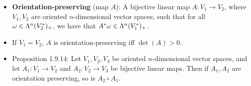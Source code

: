 \documentclass[../notes.tex]{subfiles}
\begin{document}
\begin{itemize}
\begin{proof}
\begin{equation*}
        \end{equation*}
        for all $j=1,\dots,n$. Now as will be explained below, $A$ must have the form
        \begin{equation*}
            A =
            \begin{pmatrix}
                B & C\\
                0 & D\\
            \end{pmatrix}
        \end{equation*}
        where $B$ is the $r\times r$ matrix expressing $\pi(e_1),\dots,\pi(e_r)$ as linear combinations of $\pi(f_1),\dots,\pi(f_r)$, and $D$ is the $k\times k$ matrix expressing the basis vectors $e_{r+1},\dots,e_n$ as linear combinations of $f_{r+1},\dots,f_n$. We have just explained $B$ and $D$. We don't particularly care about $C$ or have a good way of defining its structure. We can, however, take the block labeled zero to be the $k\times r$ zero matrix by Proposition 1.2.9; in particular, since these components of these vectors will be fed into $\pi$ and fall within $W$, they can moved around wherever without altering the identities of the $W$-cosets to which they pertain. Having justified this structure for $A$, we see that we can take
        \begin{equation*}
            \det(A) = \det(B)\det(D)
        \end{equation*}
        It follows by Proposition 1.9.7 as well as the positivity of $\det(A)$ and $\det(B)$ that $\det(D)$ is positive, and hence the orientation of $e_{r+1},\dots,e_n$ and $f_{r+1},\dots,f_n$ are one and the same.
    \end{proof}
    \item \textbf{Orientation-preserving} (map $A$): A bijective linear map $A:V_1\to V_2$, where $V_1,V_2$ are oriented $n$-dimensional vector spaces, such that for all $\omega\in\lam[n]{V_2^*}_+$, we have that $A^*\omega\in\lam[n]{V_1^*}_+$.
    \item If $V_1=V_2$, $A$ is orientation-preserving iff $\det(A)>0$.
    \item Proposition 1.9.14: Let $V_1,V_2,V_3$ be oriented $n$-dimensional vector spaces, and let $A_1:V_1\to V_2$ and $A_2:V_2\to V_3$ be bijective linear maps. Then if $A_1,A_2$ are orientation preserving, so is $A_2\circ A_1$.
\end{itemize}
\end{document}
